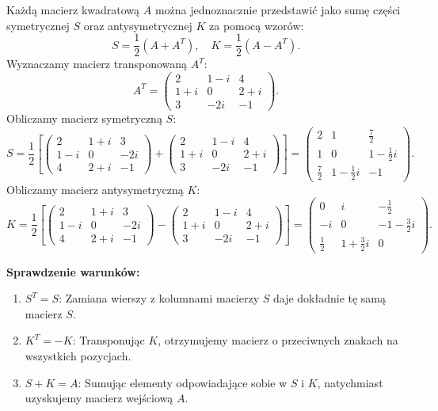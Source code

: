 \documentclass[11pt,a4paper]{article}
\newenvironment{rozwiazanie}{%
    \par\noindent{\color{AccentColor}\textbf{\textsf{Rozwiązanie:}}}\par\smallskip
}{%
    \vspace{0.4cm}{\color{MainColor}\hrule height 0.5pt}\vspace{0.3cm}
}
\begin{document}
\begin{rozwiazanie}
Każdą macierz kwadratową $A$ można jednoznacznie przedstawić jako sumę części symetrycznej $S$ oraz antysymetrycznej $K$ za pomocą wzorów:
\[
S = \frac{1}{2}(A + A^T), \quad K = \frac{1}{2}(A - A^T).
\]
Wyznaczamy macierz transponowaną $A^T$:
\[
A^T = \begin{pmatrix} 2 & 1-i & 4 \\ 1+i & 0 & 2+i \\ 3 & -2i & -1 \end{pmatrix}.
\]
Obliczamy macierz symetryczną $S$:
\[
S = \frac{1}{2}\left[\begin{pmatrix} 2 & 1+i & 3 \\ 1-i & 0 & -2i \\ 4 & 2+i & -1 \end{pmatrix} + \begin{pmatrix} 2 & 1-i & 4 \\ 1+i & 0 & 2+i \\ 3 & -2i & -1 \end{pmatrix}\right] = \begin{pmatrix} 2 & 1 & \frac{7}{2} \\ 1 & 0 & 1-\frac{1}{2}i \\ \frac{7}{2} & 1-\frac{1}{2}i & -1 \end{pmatrix}.
\]
Obliczamy macierz antysymetryczną $K$:
\[
K = \frac{1}{2}\left[\begin{pmatrix} 2 & 1+i & 3 \\ 1-i & 0 & -2i \\ 4 & 2+i & -1 \end{pmatrix} - \begin{pmatrix} 2 & 1-i & 4 \\ 1+i & 0 & 2+i \\ 3 & -2i & -1 \end{pmatrix}\right] = \begin{pmatrix} 0 & i & -\frac{1}{2} \\ -i & 0 & -1-\frac{3}{2}i \\ \frac{1}{2} & 1+\frac{3}{2}i & 0 \end{pmatrix}.
\]

\textbf{Sprawdzenie warunków:}
\begin{enumerate}[label=\alph*)]
    \item $S^T = S$: Zamiana wierszy z kolumnami macierzy $S$ daje dokładnie tę samą macierz $S$.
    \item $K^T = -K$: Transponując $K$, otrzymujemy macierz o przeciwnych znakach na wszystkich pozycjach.
    \item $S + K = A$: Sumując elementy odpowiadające sobie w $S$ i $K$, natychmiast uzyskujemy macierz wejściową $A$.
\end{enumerate}
\end{rozwiazanie}
\end{document}
